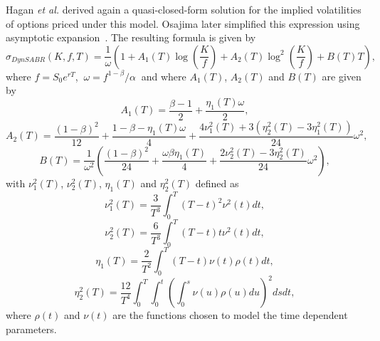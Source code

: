 Hagan \textit{et al.} derived again a quasi-closed-form solution for the implied volatilities of options priced under this model. Osajima later simplified this expression using asymptotic expansion~\cite{Osajima}. The resulting formula is given by
\begin{equation}\label{dynsabr}
\sigma_{DynSABR}(K,f,T)=\frac{1}{\omega}\left(1+A_1(T)\log\left(\frac{K}{f}\right)+A_2(T)\log^2\left(\frac{K}{f}\right)+B(T)T\right),
\end{equation}
\noindent where $f=S_0e^{rT}$, $\ \omega=f^{1-\beta}/\alpha\ $ and where $A_1(T)$, $A_2(T)$ and $B(T)$ are given by
\begin{equation}
A_1(T)=\frac{\beta-1}{2}+\frac{\eta_1(T)\omega}{2},
\end{equation}
\begin{equation}
A_2(T)=\frac{(1-\beta)^2}{12}+\frac{1-\beta-\eta_1(T)\omega}{4}+\frac{4\nu_1^2(T)+3(\eta_2^2(T)-3\eta_1^2(T))}{24}\omega^2,
\end{equation}
\begin{equation}
B(T)=\frac{1}{\omega^2}\left(\frac{(1-\beta)^2}{24}+\frac{\omega\beta\eta_1(T)}{4}+\frac{2\nu_2^2(T)-3\eta_2^2(T)}{24}\omega^2\right),
\end{equation}
\noindent with $\nu_1^2(T)$, $\nu_2^2(T)$, $\eta_1(T)$ and $\eta_2^2(T)$ defined as
\begin{equation}\label{nu1}
\nu_1^2(T)=\frac{3}{T^3}\int_0^T(T-t)^2\nu^2(t)dt,
\end{equation}
\begin{equation}
\nu_2^2(T)=\frac{6}{T^3}\int_0^T(T-t)t\nu^2(t)dt,
\end{equation}
\begin{equation}
\eta_1(T)=\frac{2}{T^2}\int_0^T(T-t)\nu(t)\rho(t)dt,
\end{equation}
\begin{equation}\label{eta2}
\eta_2^2(T)=\frac{12}{T^4}\int_0^T\int_0^t\left(\int_0^s\nu(u)\rho(u)du\right)^2dsdt,
\end{equation}
\noindent where $\rho(t)$ and $\nu(t)$ are the functions chosen to model the time dependent parameters.


